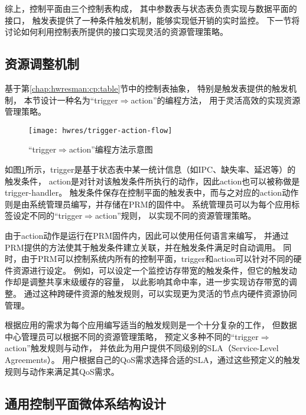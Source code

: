 综上，控制平面由三个控制表构成，
其中参数表与状态表负责实现与数据平面的接口，
触发表提供了一种条件触发机制，能够实现低开销的实时监控。
下一节将讨论如何利用控制表所提供的接口实现灵活的资源管理策略。


\subsection{资源调整机制}

基于第\ref{chap:hwresman:cp:table}节中的控制表抽象，
特别是触发表提供的触发机制，
本节设计一种名为``trigger$\Rightarrow$action''的编程方法，
用于灵活高效的实现资源管理策略。

\begin{figure}[htb]
  \centering
  \texttt{[image: hwres/trigger-action-flow]}
  \caption{``trigger$\Rightarrow$action''编程方法示意图}
  \label{fig:trigger-action-flow}
\end{figure}

如图\ref{fig:trigger-action-flow}所示，trigger是基于状态表中某一统计信息（如IPC、缺失率、延迟等）的触发条件，
action是对针对该触发条件所执行的动作，因此action也可以被称做是trigger-handler。
触发条件保存在控制平面的触发表中，而与之对应的action动作则是由系统管理员编写，并存储在PRM的固件中。
系统管理员可以为每个应用标签设定不同的``trigger$\Rightarrow$action''规则，
以实现不同的资源管理策略。

由于action动作是运行在PRM固件内，因此可以使用任何语言来编写，
并通过PRM提供的方法使其于触发条件建立关联，并在触发条件满足时自动调用。
同时，由于PRM可以控制系统内所有的控制平面，trigger和action可以针对不同的硬件资源进行设定。
例如，可以设定一个监控访存带宽的触发条件，但它的触发动作却是调整共享末级缓存的容量，
以此影响其命中率，进一步实现访存带宽的调整。
通过这种跨硬件资源的触发规则，可以实现更为灵活的节点内硬件资源协同管理。

根据应用的需求为每个应用编写适当的触发规则是一个十分复杂的工作，
但数据中心管理员可以根据不同的资源管理策略，
预定义多种不同的``trigger$\Rightarrow$action''触发规则与动作，
并依此为用户提供不同级别的SLA（Service-Level Agreements）。
用户根据自己的QoS需求选择合适的SLA，通过这些预定义的触发规则与动作来满足其QoS需求。


\subsection{通用控制平面微体系结构设计}

